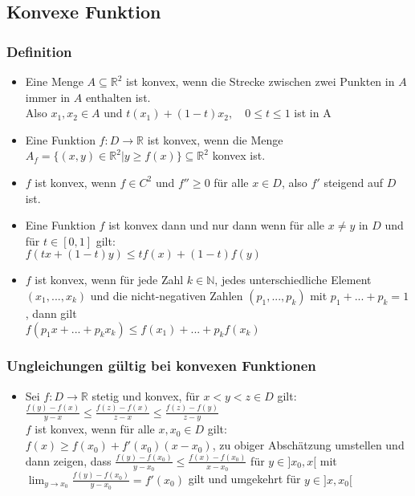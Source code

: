 \documentclass[a3paper, 11pt, landscape]{scrartcl}
\begin{document}
\begin{multicols*}{3}
    \subsection{Konvexe Funktion}
    \subsubsection{Definition}
    \begin{itemize}
        \item Eine Menge $A\subseteq \mathbb{R}^2$ ist konvex, wenn die Strecke zwischen zwei Punkten in $A$ immer in $A$ enthalten ist.\\
        Also $x_1,x_2\in A$ und $t(x_1) +(1-t)x_2,\quad 0\leq t\leq 1$ ist in A
        \item Eine Funktion $f:D\to\mathbb{R}$ ist konvex, wenn die Menge $A_f = \{(x,y)\in\mathbb{R}^2 | y \geq f(x)\}\subseteq\mathbb{R}^2$ konvex ist.
        \item $f$ ist konvex, wenn $f\in C^2$ und $f''\geq 0$ für alle $x\in D$, also $f'$ steigend auf $D$ ist.
        \item Eine Funktion $f$ ist konvex dann und nur dann wenn für alle $x\neq y$ in $D$ und für $t\in [0,1]$ gilt:\\
        $f(t x+(1-t) y) \leq t f(x)+(1-t) f(y)$
        \item $f$ ist konvex, wenn für jede Zahl $k\in\mathbb{N}$, jedes unterschiedliche Element $(x_1,...,x_k)$ und die nicht-negativen Zahlen $(p_1,...,p_k)$ mit $p_1+...+p_k=1$, dann gilt\\
        $f(p_1x+...+p_k x_k)\leq f(x_1)+...+p_k f(x_k)$
    \end{itemize}
    
    \subsubsection{Ungleichungen gültig bei konvexen Funktionen}
    \begin{itemize}
        \item Sei $f:D\to\mathbb{R}$ stetig und konvex, für $x<y<z \in D$ gilt: $\frac{f(y)-f(x)}{y-x} \leq \frac{f(z)-f(x)}{z-x} \leq \frac{f(z)-f(y)}{z-y}$ \\
        $f$ ist konvex, wenn für alle $x,x_0\in D$ gilt: $f(x)\geq f(x_0)+f'(x_0)(x-x_0)$, zu obiger Abschätzung umstellen und dann zeigen, dass $\frac{f(y)-f\left(x_{0}\right)}{y-x_{0}} \leq \frac{f(x)-f\left(x_{0}\right)}{x-x_{0}}$ für $y\in ]x_0,x[$ mit  $\lim_{y\to x_0} \frac{f(y)-f\left(x_{0}\right)}{y-x_{0}} = f'(x_0)$ gilt und umgekehrt für $y\in ]x,x_0[$
    \end{itemize}
	

\end{multicols*}
\end{document}
